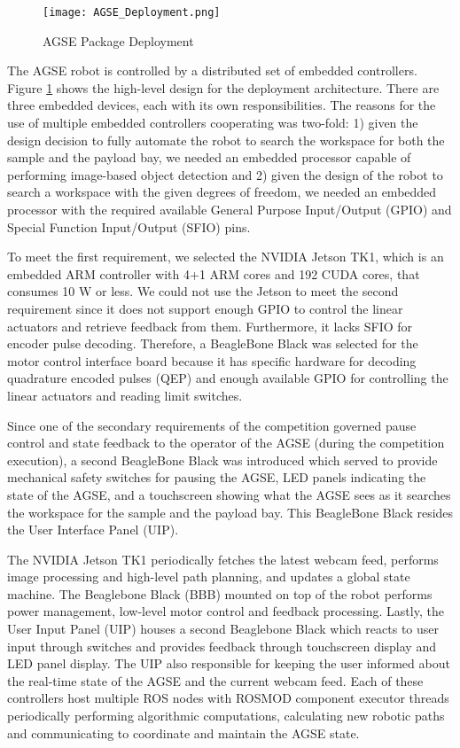 \begin{figure}[h]
	\centering
	\texttt{[image: AGSE\_Deployment.png]}
	\caption{AGSE Package Deployment}
	\label{fig:AGSE_Deployment}
\end{figure}
\FloatBarrier

The AGSE robot is controlled by a distributed set of embedded
controllers. Figure \ref{fig:AGSE_Deployment} shows the high-level
design for the deployment architecture. There are three embedded
devices, each with its own responsibilities.  The reasons for the use
of multiple embedded controllers cooperating was two-fold: 1) given
the design decision to fully automate the robot to search the
workspace for both the sample and the payload bay, we needed an
embedded processor capable of performing image-based object detection
and 2) given the design of the robot to search a workspace with the
given degrees of freedom, we needed an embedded processor with the
required available General Purpose Input/Output (GPIO) and Special
Function Input/Output (SFIO) pins. 

To meet the first requirement, we selected the NVIDIA Jetson TK1, which is an embedded ARM controller
with 4+1 ARM cores and 192 CUDA cores, that consumes 10 W or less.
We could not use the Jetson to meet the second requirement since it
does not support enough GPIO to control the linear actuators and
retrieve feedback from them.  Furthermore, it lacks SFIO for encoder
pulse decoding.  Therefore, a BeagleBone Black was selected for the
motor control interface board because it has specific hardware for
decoding quadrature encoded pulses (QEP) and enough available GPIO for
controlling the linear actuators and reading limit switches.

Since one of the secondary requirements of the competition governed
pause control and state feedback to the operator of the AGSE (during
the competition execution), a second BeagleBone Black was introduced
which served to provide mechanical safety switches for pausing the
AGSE, LED panels indicating the state of the AGSE, and a touchscreen
showing what the AGSE sees as it searches the workspace for the sample
and the payload bay.  This BeagleBone Black resides the User Interface
Panel (UIP).

The NVIDIA Jetson TK1 periodically fetches the latest webcam feed,
performs image processing and high-level path planning, and updates a
global state machine. The Beaglebone Black (BBB) mounted on top of the
robot performs power management, low-level motor control and feedback
processing. Lastly, the User Input Panel (UIP) houses a second
Beaglebone Black which reacts to user input through switches and
provides feedback through touchscreen display and LED panel
display. The UIP also responsible for keeping the user
informed about the real-time state of the AGSE and the current webcam
feed. Each of these controllers host multiple ROS nodes with ROSMOD
component executor threads periodically performing algorithmic
computations, calculating new robotic paths and communicating to
coordinate and maintain the AGSE state.

